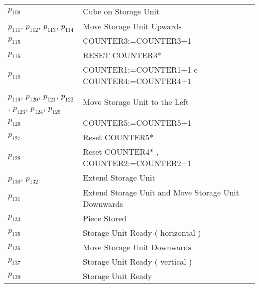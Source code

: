 \begin{longtable}{m{5cm}m{5cm}}
\hyperlink{completeNet:p108}{\hypertarget{completeTable:p108}{$p_{108}$}} & Cube on Storage Unit\\
\hyperlink{completeNet:p111}{\hypertarget{completeTable:p111}{$p_{111}$}}, \hyperlink{completeNet:p112}{\hypertarget{completeTable:p112}{$p_{112}$}}, \hyperlink{completeNet:p113}{\hypertarget{completeTable:p113}{$p_{113}$}}, \hyperlink{completeNet:p114}{\hypertarget{completeTable:p114}{$p_{114}$}} & Move Storage Unit Upwards\\
\hyperlink{completeNet:p115}{\hypertarget{completeTable:p115}{$p_{115}$}} & COUNTER3:=COUNTER3+1\\
\hyperlink{completeNet:p116}{\hypertarget{completeTable:p116}{$p_{116}$}} & RESET COUNTER3*\\
\hyperlink{completeNet:p118}{\hypertarget{completeTable:p118}{$p_{118}$}} & COUNTER1:=COUNTER1+1 e COUNTER4:=COUNTER4+1\\
\hyperlink{completeNet:p119}{\hypertarget{completeTable:p119}{$p_{119}$}}, \hyperlink{completeNet:p120}{\hypertarget{completeTable:p120}{$p_{120}$}}, \hyperlink{completeNet:p121}{\hypertarget{completeTable:p121}{$p_{121}$}}, \hyperlink{completeNet:p122}{\hypertarget{completeTable:p122}{$p_{122}$}}, \hyperlink{completeNet:p123}{\hypertarget{completeTable:p123}{$p_{123}$}}, \hyperlink{completeNet:p124}{\hypertarget{completeTable:p124}{$p_{124}$}}, \hyperlink{completeNet:p125}{\hypertarget{completeTable:p125}{$p_{125}$}} & Move Storage Unit to the Left\\
\hyperlink{completeNet:p126}{\hypertarget{completeTable:p126}{$p_{126}$}} & COUNTER5:=COUNTER5+1\\
\hyperlink{completeNet:p127}{\hypertarget{completeTable:p127}{$p_{127}$}} & Reset COUNTER5*\\
\hyperlink{completeNet:p128}{\hypertarget{completeTable:p128}{$p_{128}$}} & Reset COUNTER4* , COUNTER2:=COUNTER2+1\\
\hyperlink{completeNet:p130}{\hypertarget{completeTable:p130}{$p_{130}$}}, \hyperlink{completeNet:p132}{\hypertarget{completeTable:p132}{$p_{132}$}} & Extend Storage Unit\\
\hyperlink{completeNet:p131}{\hypertarget{completeTable:p131}{$p_{131}$}} & Extend Storage Unit and Move Storage Unit Downwards\\
\hyperlink{completeNet:p133}{\hypertarget{completeTable:p133}{$p_{133}$}} & Piece Stored\\
\hyperlink{completeNet:p135}{\hypertarget{completeTable:p135}{$p_{135}$}} & Storage Unit Ready ( horizontal )\\
\hyperlink{completeNet:p136}{\hypertarget{completeTable:p136}{$p_{136}$}} & Move Storage Unit Downwards\\
\hyperlink{completeNet:p137}{\hypertarget{completeTable:p137}{$p_{137}$}} & Storage Unit Ready ( vertical )\\
\hyperlink{completeNet:p139}{\hypertarget{completeTable:p139}{$p_{139}$}} & Storage Unit Ready\\
\end{longtable}

